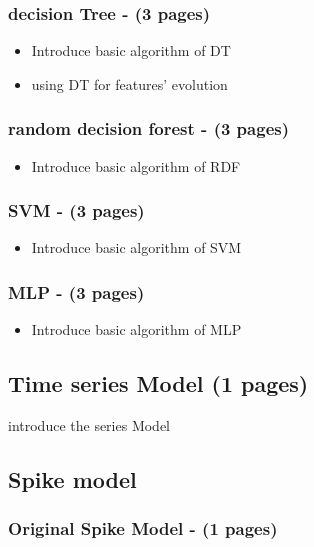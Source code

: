 \documentclass[12pt]{article}
\begin{document}
		\subsubsection{decision Tree  - (3 pages)}
		\begin{itemize}
			\item{Introduce basic algorithm of DT }
			\item{using DT for features' evolution}
		\end{itemize}
		
		\subsubsection{random decision forest  - (3 pages)}
		\begin{itemize}
			\item{Introduce basic algorithm of RDF }
		\end{itemize}
		
		\subsubsection{SVM  - (3 pages)}
		\begin{itemize}
			\item{Introduce basic algorithm of SVM }
		\end{itemize}
		
		\subsubsection{MLP  - (3 pages)}
		\begin{itemize}
			\item{Introduce basic algorithm of MLP }
		\end{itemize}

 		 
	\subsection{Time series Model  (1 pages)}
 	introduce the series Model
		

 

	\subsection{Spike model}
			\subsubsection{Original Spike Model - (1 pages)}
 
\end{document}

